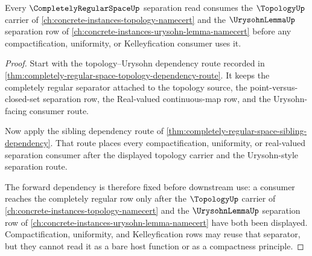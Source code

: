 \begin{theorem}
\label{thm:completely-regular-space-topology-urysohn-route}
Every $\CompletelyRegularSpaceUp$ separation read consumes the $\TopologyUp$ carrier of \autoref{ch:concrete-instances-topology-namecert} and the $\UrysohnLemmaUp$ separation row of \autoref{ch:concrete-instances-urysohn-lemma-namecert} before any compactification, uniformity, or Kelleyfication consumer uses it.
\end{theorem}
\begin{proof}
Start with the topology--Urysohn dependency route recorded in \autoref{thm:completely-regular-space-topology-dependency-route}. It keeps the completely regular separator attached to the topology source, the point-versus-closed-set separation row, the Real-valued continuous-map row, and the Urysohn-facing consumer route.

Now apply the sibling dependency route of \autoref{thm:completely-regular-space-sibling-dependency}. That route places every compactification, uniformity, or real-valued separation consumer after the displayed topology carrier and the Urysohn-style separation route.

The forward dependency is therefore fixed before downstream use: a consumer reaches the completely regular row only after the $\TopologyUp$ carrier of \autoref{ch:concrete-instances-topology-namecert} and the $\UrysohnLemmaUp$ separation row of \autoref{ch:concrete-instances-urysohn-lemma-namecert} have both been displayed. Compactification, uniformity, and Kelleyfication rows may reuse that separator, but they cannot read it as a bare host function or as a compactness principle.
\end{proof}
